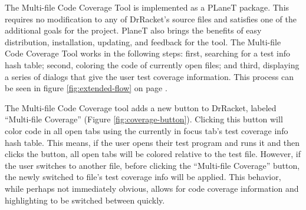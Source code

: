 The Multi-file Code Coverage Tool is implemented as a PLaneT package. This requires no modification to any of DrRacket's source files and satisfies one of the additional goals for the project. PlaneT also brings the benefits of easy distribution, installation, updating, and feedback for the tool. The Multi-file Code Coverage Tool works in the following steps: first, searching for a test info hash table; second, coloring the code of currently open files; and third, displaying a series of dialogs that give the user test coverage information. This process can be seen in figure \ref{fig:extended-flow} on page \pageref{fig:extended-flow}.

The Multi-file Code Coverage tool adds a new button to DrRacket, labeled ``Multi-file Coverage'' (Figure \ref{fig:coverage-button}). Clicking this button will color code in all open tabs using the currently in focus tab's test coverage info hash table. This means, if the user opens their test program and runs it and then clicks the button, all open tabs will be colored relative to the test file. However, if the user switches to another file, before clicking the ``Multi-file Coverage'' button, the newly switched to file's test coverage info will be applied. This behavior, while perhaps not immediately obvious, allows for code coverage information and highlighting to be switched between quickly.


